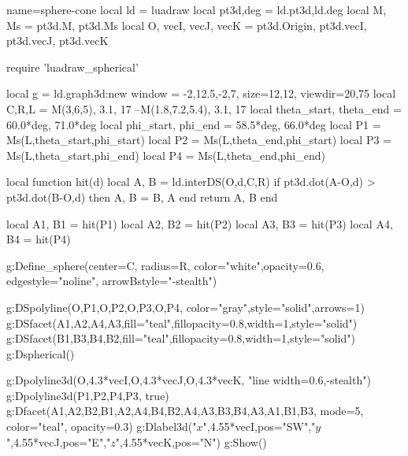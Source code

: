 \documentclass{standalone}
\begin{document}
\begin{luadraw}{name=sphere-cone}
local ld = luadraw
local pt3d,deg = ld.pt3d,ld.deg
local M, Ms = pt3d.M, pt3d.Ms
local O, vecI, vecJ, vecK = pt3d.Origin, pt3d.vecI, pt3d.vecJ, pt3d.vecK

require 'luadraw_spherical'

local g = ld.graph3d:new{
    window = {-2,12.5,-2,7},
    size={12,12},
    viewdir={20,75}
}
local C,R,L = M(3,6,5), 3.1, 17 --M(1.8,7.2,5.4), 3.1, 17
local theta_start, theta_end = 60.0*deg, 71.0*deg
local phi_start, phi_end = 58.5*deg, 66.0*deg
local P1 = Ms(L,theta_start,phi_start)
local P2 = Ms(L,theta_end,phi_start)
local P3 = Ms(L,theta_start,phi_end)
local P4 = Ms(L,theta_end,phi_end)

local function hit(d)
    local A, B = ld.interDS({O,d},{C,R})
    if pt3d.dot(A-O,d) > pt3d.dot(B-O,d) then A, B = B, A end
    return A, B
end

local A1, B1 = hit(P1)
local A2, B2 = hit(P2)
local A3, B3 = hit(P3)
local A4, B4 = hit(P4)

g:Define_sphere({center=C, radius=R, color="white",opacity=0.6, edgestyle="noline", arrowBstyle="-stealth"})

g:DSpolyline({{O,P1},{O,P2},{O,P3},{O,P4}}, {color="gray",style="solid",arrows=1})
g:DSfacet({A1,A2,A4,A3},{fill="teal",fillopacity=0.8,width=1,style="solid"})
g:DSfacet({B1,B3,B4,B2},{fill="teal",fillopacity=0.8,width=1,style="solid"})
g:Dspherical()

g:Dpolyline3d({{O,4.3*vecI},{O,4.3*vecJ},{O,4.3*vecK}}, "line width=0.6,-stealth")
g:Dpolyline3d({P1,P2,P4,P3}, true)
g:Dfacet({{A1,A2,B2,B1},{A2,A4,B4,B2},{A4,A3,B3,B4},{A3,A1,B1,B3}}, {mode=5, color="teal", opacity=0.3})
g:Dlabel3d("$x$",4.55*vecI,{pos="SW"},"$y$",4.55*vecJ,{pos="E"},"$z$",4.55*vecK,{pos="N"})
g:Show()
\end{luadraw}
\end{document}
